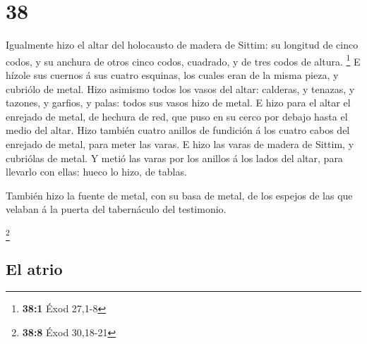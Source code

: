 \hypertarget{section-37}{%
\section{38}\label{section-37}}

 Igualmente hizo el altar del holocausto de madera de
Sittim: su longitud de cinco codos, y su anchura de otros cinco codos,
cuadrado, y de tres codos de altura. \footnote{\textbf{38:1} Éxod 27,1-8}
 E hízole sus cuernos á sus cuatro esquinas, los cuales
eran de la misma pieza, y cubriólo de metal.  Hizo
asimismo todos los vasos del altar: calderas, y tenazas, y tazones, y
garfios, y palas: todos sus vasos hizo de metal.  E hizo
para el altar el enrejado de metal, de hechura de red, que puso en su
cerco por debajo hasta el medio del altar.  Hizo también
cuatro anillos de fundición á los cuatro cabos del enrejado de metal,
para meter las varas.  E hizo las varas de madera de
Sittim, y cubriólas de metal.  Y metió las varas por los
anillos á los lados del altar, para llevarlo con ellas: hueco lo hizo,
de tablas.

 También hizo la fuente de metal, con su basa de metal, de
los espejos de las que velaban á la puerta del tabernáculo del
testimonio.

\footnote{\textbf{38:8} Éxod 30,18-21}

\hypertarget{el-atrio}{%
\subsection{El atrio}\label{el-atrio}}

